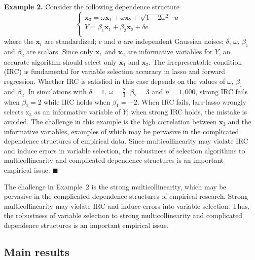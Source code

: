 \documentclass[12pt]{article}
\begin{document}
\smallskip
\noindent
\textbf{Example 2.} \citep{zhaoyu06} Consider the following dependence structure
%
\begin{equation}
            \begin{cases}
    \mathbf{x}_3 = \omega \mathbf{x}_1 + \omega \mathbf{x}_2 + \sqrt{1 - 2 \omega^2} \cdot u \\
    Y = \beta_1 \mathbf{x}_1 + \beta_2 \mathbf{x}_2 + \delta e \\
            \end{cases}
            \label{eqn:example_2}
\end{equation}
%
where the $\mathbf{x}_i$ are standardized; $e$ and $u$ are independent Gaussian noises; $\delta$, $\omega$, $\beta_1$ and $\beta_2$ are scalars. Since only $\mathbf{x}_1$ and $\mathbf{x}_2$ are informative variables for $Y$, an accurate algorithm should select only $\mathbf{x}_1$ and $\mathbf{x}_2$. The irrepresentable condition (IRC) is fundamental for variable selection accuracy in lasso and forward regression. Whether IRC is satisfied in this case depends on the values of $\omega$, $\beta_1$ and $\beta_2$. In simulations with $\delta = 1$, $\omega = \textstyle\frac{2}{3}$, $\beta_2 = 3$ and $n = 1,000$, strong IRC fails when $\beta_1 = 2$ while IRC holds when $\beta_1 = -2$. When IRC fails, lars-lasso wrongly selects $\mathrm{x}_3$ as an informative variable of $Y$; when strong IRC holds, the mistake is avoided. The challenge in this example is the high correlation between $\mathbf{x}_3$ and the informative variables, examples of which may be pervasive in the complicated dependence structures of empirical data. Since multicollinearity may violate IRC and induce errors in variable selection, the robustness of selection algorithms to multicollinearity and complicated dependence structures is an important empirical issue. $\blacksquare$

The challenge in Example~2 is the strong multicollinearity, which may be pervasive in the complicated dependence structures of empirical research. Strong multicollinearity may violate IRC and induce errors into variable selection. Thus, the robustness of variable selection to strong multicollinearity and complicated dependence structures is an important empirical issue.

\subsection{Main results}
\end{document}
